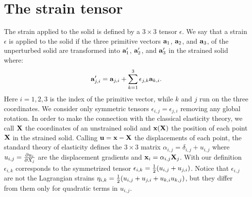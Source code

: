 \documentclass[12pt,a4paper]{article}
\begin{document}
\newpage

\section{\color{coral}The strain tensor}
The strain applied to the solid is defined by a $3\times 3$ tensor
$\epsilon$. We say that a strain $\epsilon$ is applied
to the solid if the three primitive vectors 
${\bf a}_1$, ${\bf a}_2$, and ${\bf a}_3$, of the unperturbed solid are
transformed into 
${\bf a}'_1$, ${\bf a}'_2$, and ${\bf a}'_3$ in the strained solid
where:
\begin{equation}
{\bf a}'_{j,i} = {\bf a}_{j,i} +  \sum_{k=1}^3 \epsilon_{j,k} {\bf a}_{k,i}.
\end{equation}
Here $i=1,2,3$ is the index of the primitive vector, while $k$ and $j$ run
on the three coordinates. We consider only symmetric tensors
$\epsilon_{i,j}=\epsilon_{j,i}$ removing any global rotation. 
In order to make the connection with the classical elasticity theory, we
call ${\bf X}$ the coordinates of an unstrained solid and
${\bf x}({\bf X})$ the position of each point ${\bf X}$ in
the strained solid. Calling ${\bf u}= {\bf x} -{\bf X}$ the displacements
of each point, the standard theory of elasticity defines the $3\times3$ matrix
$\alpha_{i,j}=\delta_{i,j}+u_{i,j}$ where $u_{i,j}= {\partial u_i \over 
\partial X_j}$ are the displacement gradients and 
${\bf x}_i = \alpha_{i,j} {\bf X}_j$. With our definition $\epsilon_{i,k}$
corresponds to the symmetrized tensor $\epsilon_{i,k}={1\over 2} ( u_{i,j} +
u_{j,i})$. Notice that $\epsilon_{i,j}$ are not the Lagrangian strains
$\eta_{i,k}={1\over 2} ( u_{i,j} + u_{j,i} + u_{k,i}u_{k,j})$, but they
differ from them only for quadratic terms in $u_{i,j}$. 
\end{document}
